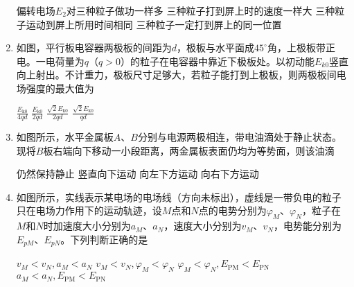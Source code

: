 \begin{enumerate}[leftmargin=0em]
\fourchoices
{偏转电场$ E_{2} $对三种粒子做功一样多}
{三种粒子打到屏上时的速度一样大}
{三种粒子运动到屏上所用时间相同}
{三种粒子一定打到屏上的同一位置}





\item
{}
如图，平行板电容器两极板的间距为$ d $，极板与水平面成$ 45 ^{ \circ } $角，上极板带正电。一电荷量为$ q $（$ q>0 $）的粒子在电容器中靠近下极板处。以初动能$ E_{k0} $竖直向上射出。不计重力，极板尺寸足够大，若粒子能打到上极板，则两极板间电场强度的最大值为  
\begin{figure}[h!]
\centering

\end{figure}
\fourchoices
{$\frac { E _ { \mathrm { k } 0 } } { 4 q d }$}
{$\frac { E _ { \mathrm { k } 0 } } { 2 q d }$}
{$\frac { \sqrt { 2 } E _ { \mathrm { k } 0 } } { 2 q d }$}
{$\frac { \sqrt { 2 } E _ { \mathrm { k } 0 } } { q d }$}





\item
{}
如图所示，水平金属板$ A $、$ B $分别与电源两极相连，带电油滴处于静止状态。现将$ B $板右端向下移动一小段距离，两金属板表面仍均为等势面，则该油滴  
\begin{figure}[h!]
\centering

\end{figure}


\fourchoices
{仍然保持静止}
{竖直向下运动}
{向左下方运动}
{向右下方运动}





\item
{}
如图所示，实线表示某电场的电场线（方向未标出），虚线是一带负电的粒子只在电场力作用下的运动轨迹，设$ M $点和$ N $点的电势分别为$ \varphi_{M} $、$ \varphi_{N} $，粒子在$ M $和$ N $时加速度大小分别为$ a_{M} $、$ a_{N} $，速度大小分别为$ v_{M} $、$ v_{N} $，电势能分别为$ E_{pM} $、$ E_{pN} $。下列判断正确的是  

\begin{minipage}[h!]{0.7\linewidth}
\vspace{0.3em}
\fourchoices
{$v _ { M } < v _ { N } , a _ { M } < a _ { N }$}
{$v _ { M } < v _ { N } , \varphi _ { M } < \varphi _ { N }$}
{$\varphi _ { M } < \varphi _ { N } , E _ { \mathrm { PM } } < E _ { \mathrm { PN } }$}
{$a _ { M } < a _ { N } , E _ { \mathrm { PM } } < E _ { \mathrm { PN } }$}


\end{minipage}
\end{enumerate}
